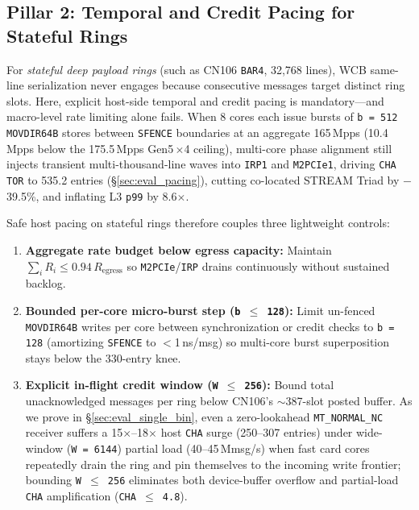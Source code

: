 \subsection{Pillar 2: Temporal and Credit Pacing for Stateful Rings}
\label{sec:design_host}

For \emph{stateful deep payload rings} (such as CN106 \texttt{BAR4}, 32,768 lines), WCB same-line serialization never engages because consecutive messages target distinct ring slots. Here, explicit host-side temporal and credit pacing is mandatory---and macro-level rate limiting alone fails. When 8 cores each issue bursts of \texttt{b\,=\,512} \texttt{MOVDIR64B} stores between \texttt{SFENCE} boundaries at an aggregate 165\,Mpps (10.4\,Mpps below the 175.5\,Mpps Gen5\,$\times$4 ceiling), multi-core phase alignment still injects transient multi-thousand-line waves into \texttt{IRP1} and \texttt{M2PCIe1}, driving \texttt{CHA TOR} to 535.2 entries (\S\ref{sec:eval_pacing}), cutting co-located STREAM Triad by $-$39.5\%, and inflating L3 \texttt{p99} by 8.6$\times$.

Safe host pacing on stateful rings therefore couples three lightweight controls:
\begin{enumerate}
  \item \textbf{Aggregate rate budget below egress capacity:} Maintain $\sum_i R_i \le 0.94\,R_{\text{egress}}$ so \texttt{M2PCIe}/\texttt{IRP} drains continuously without sustained backlog.
  \item \textbf{Bounded per-core micro-burst step (\texttt{b\,$\le$\,128}):} Limit un-fenced \texttt{MOVDIR64B} writes per core between synchronization or credit checks to \texttt{b\,=\,128} (amortizing \texttt{SFENCE} to $<$1\,ns/msg) so multi-core burst superposition stays below the 330-entry knee.
  \item \textbf{Explicit in-flight credit window (\texttt{W\,$\le$\,256}):} Bound total unacknowledged messages per ring below CN106's $\sim$387-slot posted buffer. As we prove in \S\ref{sec:eval_single_bin}, even a zero-lookahead \texttt{MT\_NORMAL\_NC} receiver suffers a 15$\times$--18$\times$ host \texttt{CHA} surge (250--307 entries) under wide-window (\texttt{W\,=\,6144}) partial load (40--45\,Mmsg/s) when fast card cores repeatedly drain the ring and pin themselves to the incoming write frontier; bounding \texttt{W\,$\le$\,256} eliminates both device-buffer overflow and partial-load \texttt{CHA} amplification (\texttt{CHA\,$\le$\,4.8}).
\end{enumerate}

